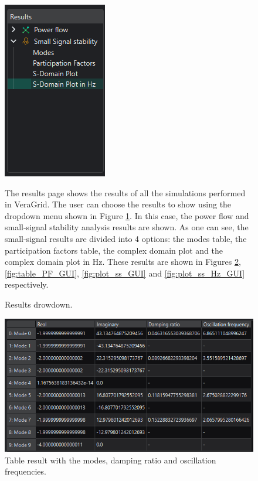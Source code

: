 \begin{figure}[H]
  \centering
  \begin{minipage}{0.35\textwidth}
    \centering
    \includegraphics[width=0.6\linewidth]{figures/results_desplegable_GUI.png}
    \caption{Results drowdown.}
    \label{fig:results_dropdown_GUI}
  \end{minipage}
  \hfill
  \begin{minipage}{0.6\textwidth}
    The results page shows the results of all the simulations performed in VeraGrid. The user can choose the results to show
    using the dropdown menu shown in Figure \ref{fig:results_dropdown_GUI}. In this case, the power flow and small-signal stability
     analysis results are shown. As one can see, the small-signal results are divided into 4 options: the modes table, the participation
     factors table, the complex domain plot and the complex domain plot in Hz. These results are shown in Figures \ref{fig:table_modes_GUI},
     \ref{fig:table_PF_GUI}, \ref{fig:plot_ss_GUI} and \ref{fig:plot_ss_Hz_GUI} respectively.
  \end{minipage}
\end{figure}

\begin{figure}[H]
  \centering
  \includegraphics[width=0.8\linewidth]{figures/result_modes_ss_GUI.png}
  \caption{Table result with the modes, damping ratio and oscillation frequencies.}
  \label{fig:table_modes_GUI}
\end{figure}

